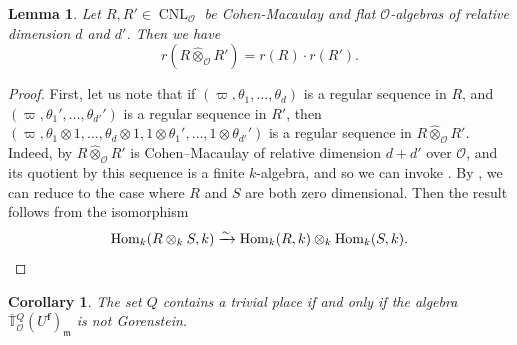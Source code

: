 \documentclass[a4paper, notitlepage, 10pt]{amsart}
\theoremstyle{plain} %
\newtheorem{lemma}[theorem]{Lemma}
\newtheorem{corollary}[theorem]{Corollary}
\theoremstyle{definition} %
\theoremstyle{remark} %
\numberwithin{equation}{section}
\newcommand{\bbT}{\mathbb T}
\newcommand{\CNL}{\operatorname{CNL}}
\newcommand{\Hom}{\operatorname{Hom}} %
\begin{document}
\begin{lemma}\label{prodoftypes}
    Let $R,R'\in \CNL_{\mathcal{O}}$ be Cohen-Macaulay and flat $\mathcal{O}$-algebras of relative dimension $d$ and $d'$. Then we have
    $$ r(R\widehat{\otimes}_{\mathcal{O}}R')=r(R)\cdot r(R').$$
\end{lemma}
\begin{proof}
    First, let us note that if $(\varpi,\theta_1,\dots,\theta_d)$ is a regular sequence in $R$, and $(\varpi,\theta_1',\dots,\theta_{d'}')$ is a regular sequence in $R'$, then $(\varpi,\theta_1\otimes 1,\dots,\theta_d\otimes 1,1\otimes\theta_1',\dots,1\otimes\theta_{d'}')$ is a regular sequence in $R\widehat{\otimes}_{\mathcal{O}}R'$. Indeed, by \cite[Lemma 4.4]{BKM1} $R\widehat{\otimes}_{\mathcal{O}}R'$ is Cohen--Macaulay of relative dimension $d+d'$ over $\mathcal{O}$, and its quotient by this sequence is a finite $k$-algebra, and so we can invoke \cite[Theorem 2.1.2 (c)]{BH98}. By , we can reduce to the case where $R$ and $S$ are both zero dimensional. Then the result follows from the isomorphism 
\begin{equation*}
\Hom_{k}(R\otimes_k S,k)\xrightarrow{\sim}
\Hom_k(R,k)\otimes_k\Hom_k(S,k).\qedhere
\end{equation*}
\end{proof}
\begin{corollary}\label{notGorenstein}
    The set $Q$ contains a trivial place if and only if the algebra $\overline{\bbT}{}^{Q}_{\mathcal{O}}(U^{\mathbf{f}})_{\mathfrak{m}}$ is not Gorenstein.
\end{corollary}
\end{document}
